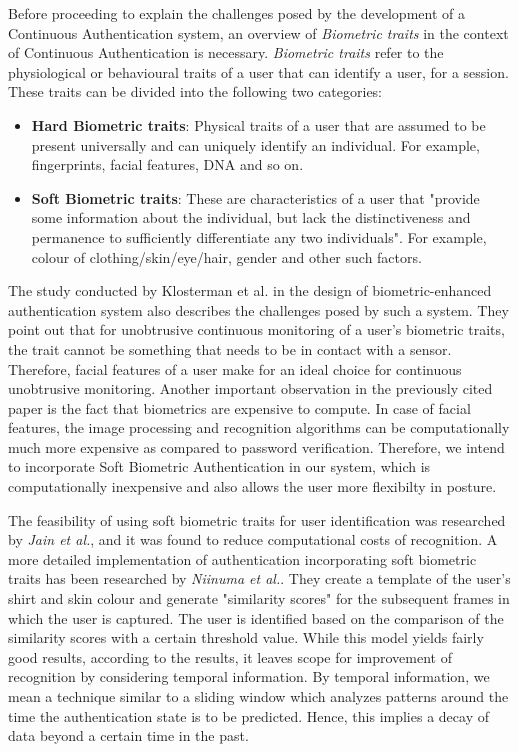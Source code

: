 \documentclass[12pt]{article}			%
\begin{document}
Before proceeding to explain the challenges posed by the development of a Continuous Authentication system, an overview of \emph{Biometric traits} in the context of Continuous Authentication is necessary.
\emph{Biometric traits} refer to the physiological or behavioural traits of a user that can identify a user, for a session.
These traits can be divided into the following two categories:
\begin{itemize}
	\item {\bf Hard Biometric traits}: Physical traits of a user that are assumed to be present universally and can uniquely identify an individual. For example, fingerprints, facial features, DNA and so on.
	\item {\bf Soft Biometric traits}: These are characteristics of a user that "provide some information about the individual, but lack the distinctiveness and permanence to sufficiently differentiate any two individuals"\cite{Jain204}. For example, colour of clothing/skin/eye/hair, gender and other such factors.
\end{itemize}

The study conducted by Klosterman et al.\cite{Klos00} in the design of biometric-enhanced authentication system also describes the challenges posed by such a system.
They point out that for unobtrusive continuous monitoring of a user's biometric traits, the trait cannot be something that needs to be in contact with a sensor.
Therefore, facial features of a user make for an ideal choice for continuous unobtrusive monitoring.
Another important observation in the previously cited paper is the fact that biometrics are expensive to compute.
In case of facial features, the image processing and recognition algorithms can be computationally much more expensive as compared to password verification.
Therefore, we intend to incorporate Soft Biometric Authentication in our system, which is computationally inexpensive and also allows the user more flexibilty in posture. 

The feasibility of using soft biometric traits for user identification was researched by \emph{Jain et al.}\cite{Jain204}, and it was found to reduce computational costs of recognition.
A more detailed implementation of authentication incorporating soft biometric traits has been researched by \emph{Niinuma et al.}\cite{Niin10}.
They create a template of the user's shirt and skin colour and generate "similarity scores" for the subsequent frames in which the user is captured.
The user is identified based on the comparison of the similarity scores with a certain threshold value.
While this model yields fairly good results, according to the results, it leaves scope for improvement of recognition by considering temporal information.
By temporal information, we mean a technique similar to a sliding window which analyzes patterns around the time the authentication state is to be predicted.
Hence, this implies a decay of data beyond a certain time in the past.
\end{document}
